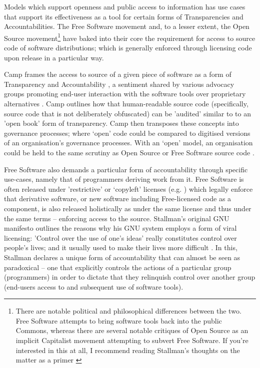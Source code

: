 Models which support openness and public access to information has use cases that support its effectiveness as a tool for certain forms of Transparencies and Accountabilities. The Free Software movement and, to a lesser extent, the Open Source movement\footnote{There are notable political and philosophical differences between the two. Free Software attempts to bring software tools back into the public Commons, whereas there are several notable critiques of Open Source as an implicit Capitalist movement attempting to subvert Free Software. If you're interested in this at all, I recommend reading Stallman's thoughts on the matter as a primer \cite{stallman_why_2002, stallman_why_2016}} have baked into their core the requirement for access to source code of software distributions; which is generally enforced through licensing code upon release in a particular way.

Camp frames the access to source of a given piece of software as a form of Transparency and Accountability \cite{camp_varieties_2006}, a sentiment shared by various advocacy groups promoting end-user interaction with the software tools over proprietary alternatives \cite{pfaff_open_1998, balter_6_2015}. Camp outlines how that human-readable source code (specifically, source code that is not deliberately obfuscated) can be 'audited' similar to to an 'open book' form of transparency. Camp then transposes these concepts into governance processes; where `open' code could be compared to digitised versions of an organisation's governance processes. With an `open' model, an organisation could be held to the same scrutiny as Open Source or Free Software source code \cite{camp_varieties_2006}.

Free Software also demands a particular form of accountability through specific use-cases, namely that of programmers deriving work from it. Free Software is often released under 'restrictive' or `copyleft' licenses (e.g. \cite{free_software_foundation_gnu_2007}) which legally enforce that derivative software, or new software including Free-licensed code as a component, is also released holistically as under the same license and thus under the same terms -- enforcing access to the source. Stallman's original GNU manifesto outlines the reasons why his GNU system employs a form of viral licensing: 'Control over the use of one's ideas' really constitutes control over people's lives; and it usually used to make their lives more difficult \cite{stallman_gnu_1985}. In this, Stallman declares a unique form of accountability that can almost be seen as paradoxical -- one that explicitly controls the actions of a particular group (programmers) in order to dictate that they relinquish control over another group (end-users access to and subsequent use of software tools).

